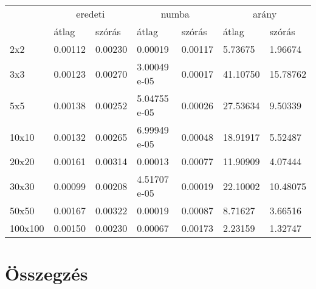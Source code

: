 \documentclass{article}
\theoremstyle{definition}
\theoremstyle{theorem}
\begin{document}
\begin{center}
\begin{tabular}{l|ll|ll|ll|}
\cline{2-7}
                              & \multicolumn{2}{c|}{eredeti}           & \multicolumn{2}{c|}{numba}             & \multicolumn{2}{c|}{arány}              \\ \cline{2-7}
                              & \multicolumn{1}{l|}{átlag}   & szórás  & \multicolumn{1}{l|}{átlag}   & szórás  & \multicolumn{1}{l|}{átlag}    & szórás  \\ \hline
\multicolumn{1}{|l|}{2x2}     & \multicolumn{1}{l|}{0.00112} & 0.00230 & \multicolumn{1}{l|}{0.00019} & 0.00117 & \multicolumn{1}{l|}{5.73675}  & 1.96674 \\ \hline
\multicolumn{1}{|l|}{3x3}   & \multicolumn{1}{l|}{0.00123} & 0.00270 & \multicolumn{1}{l|}{3.00049 e-05} & 0.00017 & \multicolumn{1}{l|}{41.10750} & 15.78762 \\ \hline
\multicolumn{1}{|l|}{5x5}   & \multicolumn{1}{l|}{0.00138} & 0.00252 & \multicolumn{1}{l|}{5.04755 e-05} & 0.00026 & \multicolumn{1}{l|}{27.53634} & 9.50339  \\ \hline
\multicolumn{1}{|l|}{10x10} & \multicolumn{1}{l|}{0.00132} & 0.00265 & \multicolumn{1}{l|}{6.99949 e-05} & 0.00048 & \multicolumn{1}{l|}{18.91917} & 5.52487  \\ \hline
\multicolumn{1}{|l|}{20x20}   & \multicolumn{1}{l|}{0.00161} & 0.00314 & \multicolumn{1}{l|}{0.00013} & 0.00077 & \multicolumn{1}{l|}{11.90909} & 4.07444 \\ \hline
\multicolumn{1}{|l|}{30x30} & \multicolumn{1}{l|}{0.00099} & 0.00208 & \multicolumn{1}{l|}{4.51707 e-05} & 0.00019 & \multicolumn{1}{l|}{22.10002} & 10.48075 \\ \hline
\multicolumn{1}{|l|}{50x50}   & \multicolumn{1}{l|}{0.00167} & 0.00322 & \multicolumn{1}{l|}{0.00019} & 0.00087 & \multicolumn{1}{l|}{8.71627}  & 3.66516 \\ \hline
\multicolumn{1}{|l|}{100x100} & \multicolumn{1}{l|}{0.00150} & 0.00230 & \multicolumn{1}{l|}{0.00067} & 0.00173 & \multicolumn{1}{l|}{2.23159}  & 1.32747 \\ \hline
\end{tabular}
\end{center}
\section{Összegzés}
\end{document}

